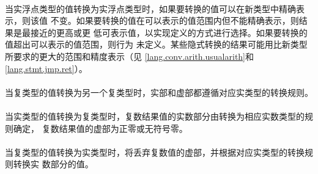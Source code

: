 {                                     
\paragraph{}
当实浮点类型的值转换为实浮点类型时，如果要转换的值可以在新类型中精确表示，则该值
不变。如果要转换的值在可以表示的值范围内但不能精确表示，则结果是最接近的更高或更
低可表示值，以实现定义的方式进行选择。如果要转换的值超出可以表示的值范围，则行为
未定义。某些隐式转换的结果可能用比新类型所要求的更大的范围和精度表示（见
\ref{lang.conv.arith.usualarith}和\ref{lang.stmt.jmp.ret}）。

\paragraph{}
当复类型的值转换为另一个复类型时，实部和虚部都遵循对应实类型的转换规则。

\paragraph{}
当实类型的值转换为复类型时，复数结果值的实数部分由转换为相应实数类型的规则确定，
复数结果值的虚部为正零或无符号零。

\paragraph{}
当复类型的值转换为实类型时，将丢弃复数值的虚部，并根据对应实类型的转换规则转换实
数部分的值。

}
